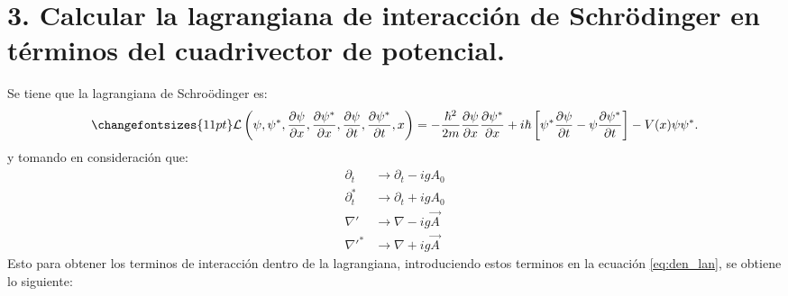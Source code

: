 \section*{3. Calcular la lagrangiana de interacción de Schr\"odinger en términos del cuadrivector de potencial.}
Se tiene que la lagrangiana de Schro\"odinger es:
\begin{equation}
    \changefontsizes{11pt}
    \mathcal{L}\left(\psi,\psi^*,\frac{\partial \psi}{\partial x},\frac{\partial \psi^*}{\partial x},\frac{\partial \psi}{\partial t},\frac{\partial \psi^*}{\partial t},x\right) = -\frac{\hbar^2}{2m} \frac{\partial \psi}{\partial x} \frac{\partial \psi^*}{\partial x}+i\hbar \left[ \psi^* \frac{\partial \psi}{\partial t} - \psi \frac{\partial \psi^*}{\partial t} \right] -V(x)\psi \psi^*.
    \label{eq:den_lan}
\end{equation}
y tomando en consideración que:
\begin{align*}
    \partial_t &\rightarrow\partial_t -igA_0\\
    \partial_t^* &\rightarrow\partial_t +igA_0\\
    {\nabla}' & \rightarrow \nabla - ig\vec{A}\\
    {\nabla}'^* & \rightarrow \nabla + ig\vec{A}
\end{align*}
Esto para obtener los terminos de interacción dentro de la lagrangiana, introduciendo estos terminos en la ecuación \ref{eq:den_lan}, se obtiene lo siguiente:
